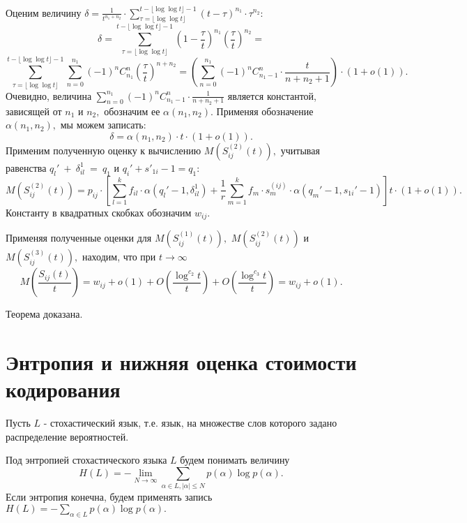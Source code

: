 \documentclass[%
11pt,a4paper]{article}
\begin{document}
{{{Оценим величину
$
\delta=\frac{1}{t^{n_1+n_2}}\cdot \sum_{\tau=\lfloor \log\log t \rfloor}^{t-\lfloor \log\log t \rfloor-1}
(t-\tau)^{n_1}\cdot \tau^{n_2}:
$
$$
\delta=
\sum_{\tau=\lfloor \log\log t \rfloor}^{t-\lfloor \log\log t \rfloor-1} \left(1-\frac{\tau}{t}\right)^{n_1} \left(\frac{\tau}{t}\right)^{n_2}=
$$
$$
\sum_{\tau=\lfloor \log\log t \rfloor}^{t-\lfloor \log\log t \rfloor-1}
\sum_{n=0}^{n_1} (-1)^{n} C_{n_1}^n \left( \frac{\tau}{t} \right)^{n+n_2} =
\left(\sum_{n=0}^{n_1} (-1)^{n} C_{n_1-1}^n \cdot \frac{t}{n+n_2+1}  \right)\cdot (1+o(1)).
$$
Очевидно, величина $\sum_{n=0}^{n_1} (-1)^{n} C_{n_1-1}^n \cdot \frac{1}{n+n_2+1}$ является константой, зависящей от $n_1$ и $n_2,$ обозначим ее $\alpha(n_1,n_2)$.
Применяя обозначение $\alpha(n_1,n_2),$ мы можем записать:
$$
\delta=\alpha(n_1,n_2)\cdot t\cdot (1+o(1)).
$$
Применим полученную оценку к вычислению $M\left(S_{ij}^{(2)}(t)\right),$ учитывая равенства
$q_l'~+~\delta_{il}^1~=~q_1$ и $q_i'+s'_{1i}-1=q_1:$
$$
M\left(S_{ij}^{(2)}(t)\right)=p_{ij}\cdot
\left[\sum_{l =1}^k f_{il} \cdot \alpha(q_l'-1,\delta_{il}^1)+
\frac{1}{{r }} \sum_{m=1}^k f_m\cdot s_m^{(ij)}\cdot
\alpha(q_m'-1,s_{1i}'-1)\right]t \cdot(1+o(1)).
$$
Константу в квадратных скобках обозначим $w_{ij}.$

Применяя полученные оценки для $M\left(S_{ij}^{(1)}(t)\right),$
$M\left(S_{ij}^{(2)}(t)\right)$ и
$M\left(S_{ij}^{(3)}(t)\right),$ находим, что при $t \rightarrow \infty$
$$
M\left(\frac{S_{ij}(t)}{t}\right)=w_{ij}+o(1)+
O\left(\frac{\log^{c_2} t}{t}\right) +
O\left(\frac{\log ^{c_3} t}{t}\right)=w_{ij}+o(1).
$$

Теорема доказана.

\medskip

\section {
Энтропия и нижняя оценка стоимости кодирования}

Пусть $L$ - стохастический язык, т.е. язык, на множестве слов которого задано распределение вероятностей.

Под энтропией стохастического языка $L$ будем понимать величину
$$
H(L)=-\lim_{N \rightarrow \infty} \sum_{\alpha \in L, \left|\alpha\right|\le N} p(\alpha) \log p(\alpha).
$$
Если энтропия конечна, будем применять запись $H(L)=-\sum_{\alpha \in L} p(\alpha) \log p(\alpha).$

}}}
\end{document}
